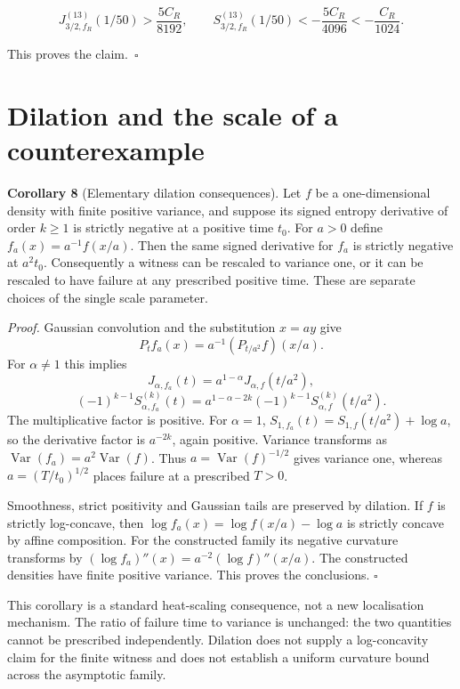 \documentclass[
  11pt,
]{article}
\begin{document}
\[
J_{3/2,f_R}^{(13)}(1/50)>\frac{5C_R}{8192},
 \qquad
 S_{3/2,f_R}^{(13)}(1/50)<-\frac{5C_R}{4096}
                         <-\frac{C_R}{1024}.
\]

This proves the claim.~\(\square\)

\section{Dilation and the scale of a
counterexample}\label{dilation-and-the-scale-of-a-counterexample}

\textbf{Corollary 8} (Elementary dilation consequences). Let \(f\) be a
one-dimensional density with finite positive variance, and suppose its
signed entropy derivative of order \(k\geq1\) is strictly negative at a
positive time \(t_0\). For \(a>0\) define \(f_a(x)=a^{-1}f(x/a)\). Then
the same signed derivative for \(f_a\) is strictly negative at
\(a^2t_0\). Consequently a witness can be rescaled to variance one, or
it can be rescaled to have failure at any prescribed positive time.
These are separate choices of the single scale parameter.

\emph{Proof.} Gaussian convolution and the substitution \(x=ay\) give
\[
P_t f_a(x)=a^{-1}(P_{t/a^2}f)(x/a).
\]
For \(\alpha\ne1\) this implies
\[
J_{\alpha,f_a}(t)=a^{1-\alpha}J_{\alpha,f}(t/a^2),
\]
\[
(-1)^{k-1}S_{\alpha,f_a}^{(k)}(t)
=a^{1-\alpha-2k}(-1)^{k-1}S_{\alpha,f}^{(k)}(t/a^2).
\]
The multiplicative factor is positive. For \(\alpha=1\),
\(S_{1,f_a}(t)=S_{1,f}(t/a^2)+\log a\), so the derivative factor is
\(a^{-2k}\), again positive. Variance transforms as
\(\operatorname{Var}(f_a)=a^2\operatorname{Var}(f)\). Thus
\(a=\operatorname{Var}(f)^{-1/2}\) gives variance one, whereas
\(a=(T/t_0)^{1/2}\) places failure at a prescribed \(T>0\).

Smoothness, strict positivity and Gaussian tails are preserved by
dilation. If \(f\) is strictly log-concave, then
\(\log f_a(x)=\log f(x/a)-\log a\) is strictly concave by affine composition.
For the constructed family its negative curvature transforms by
\((\log f_a)''(x)=a^{-2}(\log f)''(x/a)\). The constructed densities have finite positive variance.
This proves the conclusions. \(\square\)

This corollary is a standard heat-scaling consequence, not a new
localisation mechanism. The ratio of failure time to variance is
unchanged: the two quantities cannot be prescribed independently.
Dilation does not supply a log-concavity claim for the finite witness
and does not establish a uniform curvature bound across the asymptotic
family.
\end{document}
